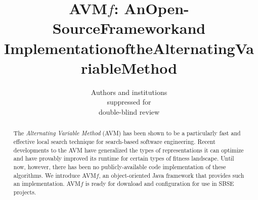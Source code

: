 \documentclass{llncs}
\newcommand{\AVM}{Alternating Variable Method\xspace}
\newcommand{\name}{AVM\hspace{-1pt}$f$\xspace}
\begin{document}
\title{\texorpdfstring{\name: An\:Open-Source\:Framework\:and\\$\!$Implementation\:of\:the\:Alternating\:Variable\:Method\vspace{-.5em}}{}}



\author{
	Authors and institutions\\
	suppressed for\\
	\vspace{1mm} \small{double-blind review}
	\vspace{-2em}
}
\institute{}

\maketitle

\begin{abstract}
The {\it \AVM} (AVM) has been shown to be a particularly fast and effective local search technique for %
search-based software engineering.
%
Recent developments to the AVM have generalized the types of representations it can optimize and have provably improved its runtime for certain types of fitness landscape. Until now, however, there has been no publicly-available code implementation of these algorithms. We introduce \name, an object-oriented Java framework that provides such an implementation. \name is ready for download and configuration for use in SBSE projects.

\end{abstract}

\vspace{-1em}
\end{document}
